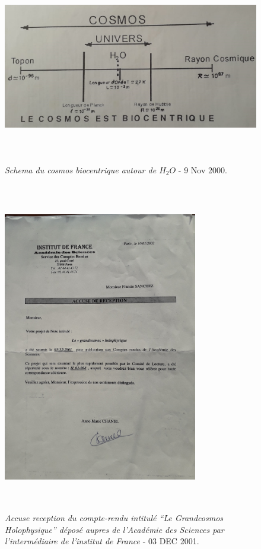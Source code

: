 \documentclass[a4paper,12pt]{article}
\begin{document}
\begin{appendix}
\begin{figure}
\centering
\includegraphics[width=14.5cm,height=8.5cm]{./figures/h2o-biocentrique.jpg}
\caption[Schema du Cosmos Biocentrique $H_2O$ ]{\textit{Schema du cosmos biocentrique autour de $H_2O$} - 9 Nov 2000.} 
\label{fig:13:figure13}
\end{figure}

\begin{figure}
\centering
\includegraphics[width=8.5cm,height=14.5cm]{./figures/AcadSciences2001.jpg}
\caption[Accuse reception du depot du compte-rendu aupres de l'Academie des Sciences]{\textit{Accuse reception du compte-rendu intitulé ``Le Grandcosmos Holophysique'' déposé aupres de l'Académie des Sciences par l'intermédiaire de l'institut de France} - 03 DEC 2001.} 
\label{fig:14:figure14}
\end{figure}


\end{appendix}
\end{document}
